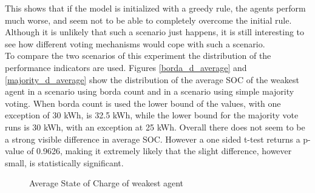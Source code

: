 \documentclass[a4paper]{article}
\begin{document}
This shows that if the model is initialized with a greedy rule, the agents perform much worse, and seem not to be able to 
completely overcome the initial rule. Although it is unlikely that such a scenario just happens, it is still interesting 
to see how different voting mechanisms would cope with such a scenario.\\
To compare the two scenarios of this experiment the distribution of the performance indicators are used. 
Figures \ref{borda_d_average} and \ref{majority_d_average} show the distribution of the average SOC of the weakest agent
in a scenario using borda count and in a scenario using simple majority voting. When borda count is used the lower bound 
of the values, with one exception of 30 kWh, is 32.5 kWh, while the lower bound for the majority vote runs is 
30 kWh, with an exception at 25 kWh. Overall there does not seem to be a strong visible difference in average SOC.
However a  one sided t-test returns a p-value of 0.9626, making it extremely likely that the slight difference, however small, is 
statistically significant.\\
\begin{figure}[!ht]
\caption{Average State of Charge of weakest agent}
\label{d_average}
\end{figure}\\
\end{document}
